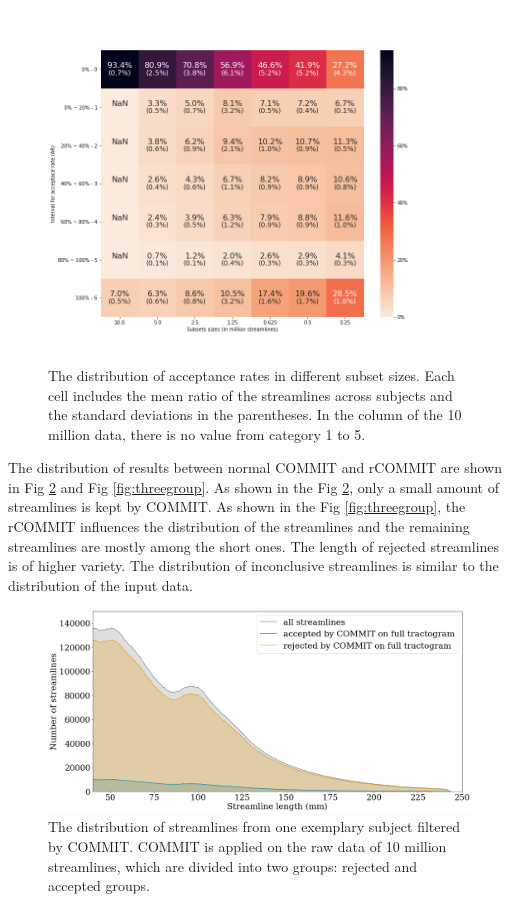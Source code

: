 \begin{figure}[ht]
    \centering
    \includegraphics[width= 12cm]{figures/heatmap_new.png}
        \caption{The distribution of acceptance rates in different subset sizes. Each cell includes the mean ratio of 
        the streamlines across subjects and the standard deviations in the parentheses. In the column of the 10 million data, there is no value from category 1 to 5.
        }
    \label{fig:heatmap}
\end{figure}

The distribution of results between normal COMMIT and rCOMMIT are shown in Fig \ref{fig:ori_distri} and Fig \ref{fig:threegroup}.
As shown in the Fig \ref{fig:ori_distri}, only a small amount of streamlines is kept by COMMIT. As shown in the Fig \ref{fig:threegroup}, the rCOMMIT influences the distribution of the streamlines and the remaining 
streamlines are mostly among the short ones. The length of rejected streamlines is of higher variety. The distribution of inconclusive streamlines
is similar to the distribution of the input data.

\begin{figure}[ht]
    \centering
    \includegraphics[width= 12cm]{figures/distributon_origi.png}
        \caption{The distribution of streamlines from one exemplary subject filtered by COMMIT. COMMIT is applied on the raw data of 10 million streamlines, which are 
        divided into two groups: rejected and accepted groups.}
    \label{fig:ori_distri}
\end{figure}

